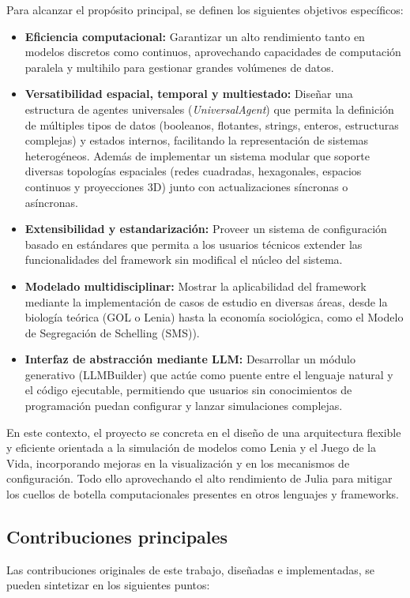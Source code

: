 \documentclass[runningheads]{llncs}
\begin{document}
Para alcanzar el propósito principal, se definen los siguientes objetivos específicos:
\begin{itemize}
    \item \textbf{Eficiencia computacional:} Garantizar un alto rendimiento tanto en modelos discretos como continuos, aprovechando capacidades de computación paralela y multihilo para gestionar grandes volúmenes de datos.
    \item \textbf{Versatibilidad espacial, temporal y multiestado:} Diseñar una estructura de agentes universales (\textit{UniversalAgent}) que permita la definición de múltiples tipos de datos (booleanos, flotantes, strings, enteros, estructuras complejas) y estados internos, facilitando la representación de sistemas heterogéneos. Además de implementar un sistema modular que soporte diversas topologías espaciales (redes cuadradas, hexagonales, espacios continuos y proyecciones 3D) junto con actualizaciones síncronas o asíncronas.
    \item \textbf{Extensibilidad y estandarización:} Proveer un sistema de configuración basado en estándares que permita a los usuarios técnicos extender las funcionalidades del framework sin modifical el núcleo del sistema.
    \item \textbf{Modelado multidisciplinar:} Mostrar la aplicabilidad del framework mediante la implementación de casos de estudio en diversas áreas, desde la biología teórica (GOL o Lenia) hasta la economía sociológica, como el Modelo de Segregación de Schelling (SMS)\cite{ref_schelling}).
    \item \textbf{Interfaz de abstracción mediante LLM:} Desarrollar un módulo generativo (LLMBuilder) que actúe como puente entre el lenguaje natural y el código ejecutable, permitiendo que usuarios sin conocimientos de programación puedan configurar y lanzar simulaciones complejas.
\end{itemize}

En este contexto, el proyecto se concreta en el diseño de una arquitectura flexible y eficiente orientada a la simulación de modelos como Lenia y el Juego de la Vida, incorporando mejoras en la visualización y en los mecanismos de configuración. Todo ello aprovechando el alto rendimiento de Julia para mitigar los cuellos de botella computacionales presentes en otros lenguajes y frameworks.\\

\subsection{Contribuciones principales}
Las contribuciones originales de este trabajo, diseñadas e implementadas, se pueden sintetizar en los siguientes puntos:
\end{document}

